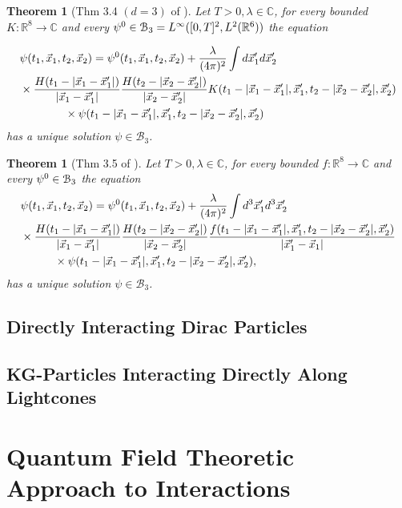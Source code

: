 \documentclass[b5paper,draft,openbib,12pt]{memoir}
\newtheorem{Thm}[Def]{Theorem}
\begin{document}
\begin{Thm}[Thm 3.4 \((d=3)\) of \cite{lienertfirst}]
Let \(T>0, \lambda\in\mathbb{C}\), for every bounded \(K:\mathbb{R}^8\rightarrow\mathbb{C}\) and every
\(\psi^{0} \in\mathcal{B}_3=L^\infty([0,T]^2,L^2(\mathbb{R}^6))\)
the equation 

\begin{align*}
&\psi(t_1,{\vec{x}}_1,t_2,{\vec{x}}_2)=\psi^{0}(t_1,{\vec{x}}_1,t_2,{\vec{x}}_2)+\frac{\lambda}{(4\pi)^2}\int d{\vec{x}}_1' d{\vec{x}}_2'\\
&\times \frac{H(t_1-|{\vec{x}}_1-{\vec{x}}_1'|)}{|{\vec{x}}_1-{\vec{x}}_1'|}\frac{H(t_2-|{\vec{x}}_2-{\vec{x}}_2'|)}{|{\vec{x}}_2-{\vec{x}}_2'|}K(t_1-|{\vec{x}}_1-{\vec{x}}_1'|,{\vec{x}}_1',t_2-|{\vec{x}}_2-{\vec{x}}_2'|,{\vec{x}}_2')\\
&\quad\quad\quad\quad \times\psi(t_1-|{\vec{x}}_1-{\vec{x}}_1'|,{\vec{x}}_1',t_2-|{\vec{x}}_2-{\vec{x}}_2'|,{\vec{x}}_2')
\end{align*}
has a unique solution \(\psi\in\mathcal{B}_3\).
\end{Thm}

\begin{Thm}[Thm 3.5 of \cite{lienertfirst}]
  Let \(T>0, \lambda\in\mathbb{C}\), for every bounded \(f:\mathbb{R}^8\rightarrow \mathbb{C}\) and every \(\psi^{0} \in \mathcal{B}_3\) the equation
\begin{align*}
&\psi(t_1,{\vec{x}}_1,t_2,{\vec{x}}_2)=\psi^{0}(t_1,{\vec{x}}_1,t_2,{\vec{x}}_2) + \frac{\lambda}{(4\pi)^2}\int d^3{\vec{x}}_1'd^3{\vec{x}}_2'\\
& \times \frac{H(t_1-|{\vec{x}}_1-{\vec{x}}_1'|)}{|{\vec{x}}_1-{\vec{x}}_1'|} \frac{H(t_2-|{\vec{x}}_2-{\vec{x}}_2'|)}{|{\vec{x}}_2-{\vec{x}}_2'|} \frac{f(t_1-|{\vec{x}}_1-{\vec{x}}_1'|,{\vec{x}}_1',t_2-|{\vec{x}}_2-{\vec{x}}_2'|,{\vec{x}}_2')}{|{\vec{x}}_1'-{\vec{x}}_1|}\\
&\quad \quad \quad \times \psi(t_1-|{\vec{x}}_1-{\vec{x}}_1'|,{\vec{x}}_1',t_2-|{\vec{x}}_2-{\vec{x}}_2'|,{\vec{x}}_2'),
\end{align*}
has a unique solution \(\psi\in\mathcal{B}_3\).
\end{Thm}





\section{Directly Interacting Dirac Particles}\label{sec:direct dirac}

\section{KG-Particles Interacting Directly Along Lightcones}\label{sec:KG lightcones}


\chapter[Quantum Field Theoretic Approach to Interactions][Interaction in QFT]{Quantum Field Theoretic Approach to Interactions} \label{sec:QFT}
\end{document}
